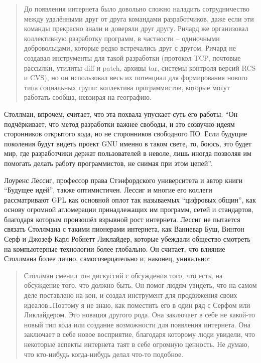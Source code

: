 \begin{quote}
До появления интернета было довольно сложно наладить сотрудничество между удалёнными друг от друга командами разработчиков, даже если эти команды прекрасно знали и доверяли друг другу. Ричард же организовал коллективную разработку программ, в частности -- одиночными добровольцами, которые редко встречались друг с другом. Ричард не создавал инструменты для такой разработки (протокол TCP, почтовые рассылки, утилиты diff и patch, архивы tar, системы контроля версий RCS и CVS), но он использовал весь их потенциал для формирования нового типа социальных групп: коллектива программистов, которые могут работать сообща, невзирая на географию.
\end{quote}

Столлман, впрочем, считает, что эта похвала упускает суть его работы. \enquote{Он подчёркивает, что метод разработки важнее свободы, и это созвучно идеям сторонников открытого кода, но не сторонников свободного ПО. Если будущие поколения будут видеть проект GNU именно в таком свете, то, боюсь, это будет мир, где разработчики держат пользователей в неволе, лишь иногда позволяя им помогать делать работу программистов, не снимая при этом цепей}.

Лоуренс Лессиг, профессор права Стэнфордского университета и автор книги \enquote{Будущее идей}, также оптимистичен. Лессиг и многие его коллеги рассматривают GPL как основной оплот так называемых \enquote{цифровых общин}, как основу огромной агломерации принадлежащих им программ, сетей и стандартов, благодаря которым произошёл взрывной рост интернета. Лессиг не пытается связать Столлмана с такими пионерами интернета, как Ванневар Буш, Винтон Серф и Джозеф Карл Робнетт Ликлайдер, которые убеждали общество смотреть на компьютерные технологии более глобально. Он считает, что влияние Столлмана более лично, самосозерцательно и, наконец, уникально:

\begin{quote}
Столлман сменил тон дискуссий с обсуждения того, что есть, на обсуждение того, что должно быть. Он помог людям увидеть, что на самом деле поставлено на кон, и создал инструмент для продвижения своих идеалов\ldots Поэтому я не знаю, как поместить его в один ряд с Серфом или Ликлайдером. Это новация другого рода. Она заключает в себе не какой-то новый тип кода или создание возможности для появления интернета. Она заключает в себе новое восприятие, благодаря которому люди увидели, что некоторые аспекты интернета таят в себе огромную ценность. Не думаю, что кто-нибудь когда-нибудь делал что-то подобное.
\end{quote}

